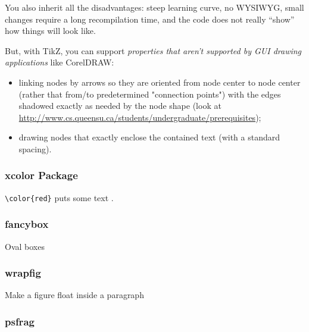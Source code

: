 \documentclass{mcreport}
\begin{document}
You also inherit all the disadvantages: steep learning curve, no
\acs{WYSIWYG}, small changes require a long recompilation time, and the code
does not really ``show'' how things will look like.

But, with TikZ, you can support \emph{properties that aren't supported by
GUI drawing applications} like CorelDRAW:

\begin{itemize}
    \item linking nodes by arrows so they are oriented from node center to
    node center (rather that from/to predetermined "connection points") with
    the edges shadowed exactly as needed by the node shape (look at
    \href{http://www.cs.queensu.ca/students/undergraduate/prerequisites}
    {http://www.cs.queensu.ca/students/undergraduate/prerequisites});

    \item drawing nodes that exactly enclose the contained text (with a
    standard spacing).
\end{itemize}

\subsubsection{xcolor Package}

\verb|\color{red}| puts some text \color{red}{in red}\color{black}.

\subsubsection{fancybox}

Oval boxes

\subsubsection{wrapfig}

Make a figure float inside a paragraph

\subsubsection{psfrag}


\end{document}
